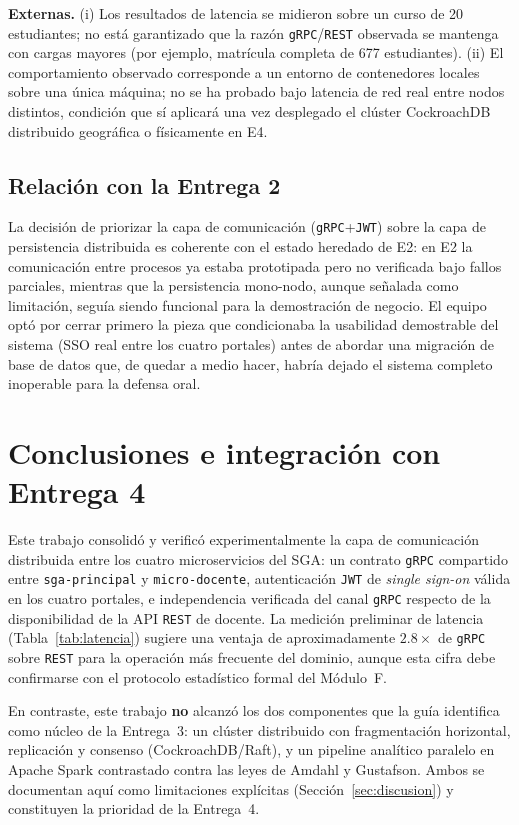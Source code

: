 \documentclass[12pt,a4paper]{article}
\begin{document}
\textbf{Externas.} (i) Los resultados de latencia se midieron sobre un
curso de 20 estudiantes; no está garantizado que la razón
\texttt{gRPC}/\texttt{REST} observada se mantenga con cargas mayores (por
ejemplo, matrícula completa de 677 estudiantes). (ii) El comportamiento
observado corresponde a un entorno de contenedores locales sobre una única
máquina; no se ha probado bajo latencia de red real entre nodos distintos,
condición que sí aplicará una vez desplegado el clúster CockroachDB
distribuido geográfica o físicamente en E4.

\subsection{Relación con la Entrega 2}

La decisión de priorizar la capa de comunicación (\texttt{gRPC}+\texttt{JWT})
sobre la capa de persistencia distribuida es coherente con el estado
heredado de E2: en E2 la comunicación entre procesos ya estaba prototipada
pero no verificada bajo fallos parciales, mientras que la persistencia
mono-nodo, aunque señalada como limitación, seguía siendo funcional para
la demostración de negocio. El equipo optó por cerrar primero la pieza que
condicionaba la usabilidad demostrable del sistema (SSO real entre los
cuatro portales) antes de abordar una migración de base de datos que, de
quedar a medio hacer, habría dejado el sistema completo inoperable para la
defensa oral.


\section{Conclusiones e integración con Entrega 4}
\label{sec:conclusiones}

Este trabajo consolidó y verificó experimentalmente la capa de
comunicación distribuida entre los cuatro microservicios del SGA: un
contrato \texttt{gRPC} compartido entre \texttt{sga-principal} y
\texttt{micro-docente}, autenticación \texttt{JWT} de \emph{single
sign-on} válida en los cuatro portales, e independencia verificada del
canal \texttt{gRPC} respecto de la disponibilidad de la API \texttt{REST}
de docente. La medición preliminar de latencia (Tabla~\ref{tab:latencia})
sugiere una ventaja de aproximadamente $2.8\times$ de \texttt{gRPC} sobre
\texttt{REST} para la operación más frecuente del dominio, aunque esta
cifra debe confirmarse con el protocolo estadístico formal del Módulo~F.

En contraste, este trabajo \textbf{no} alcanzó los dos componentes que la
guía identifica como núcleo de la Entrega~3: un clúster distribuido con
fragmentación horizontal, replicación y consenso (CockroachDB/Raft), y un
pipeline analítico paralelo en Apache Spark contrastado contra las leyes de
Amdahl y Gustafson. Ambos se documentan aquí como limitaciones explícitas
(Sección~\ref{sec:discusion}) y constituyen la prioridad de la Entrega~4.
\end{document}
